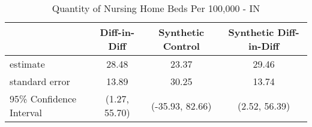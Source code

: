 \begin{table}[ht]
\centering
\begin{tabular}{lccc}
  \hline
 & Diff-in-Diff & Synthetic Control & Synthetic Diff-in-Diff \\ 
  \hline
estimate & 28.48 & 23.37 & 29.46 \\ 
  standard error & 13.89 & 30.25 & 13.74 \\ 
  95\% Confidence Interval & (1.27, 55.70) & (-35.93, 82.66) & (2.52, 56.39) \\ 
   \hline
\end{tabular}
\caption{Quantity of Nursing Home Beds Per 100,000 - IN} 
\end{table}
